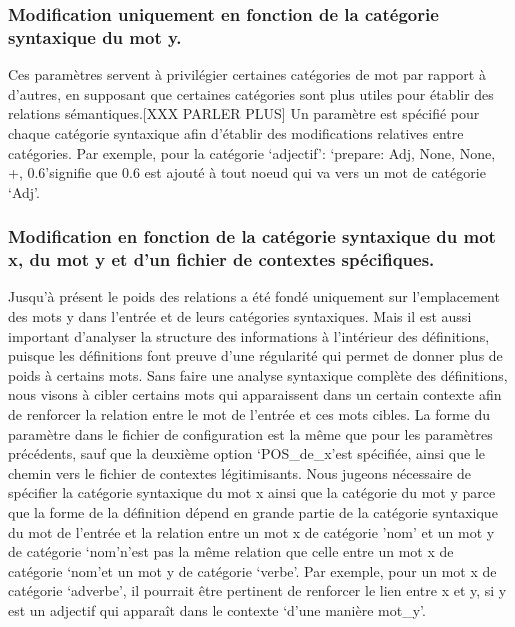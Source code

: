 \documentclass[a4paper, 12pt]{article}
\begin{document}
\subsubsection{Modification uniquement en fonction de la catégorie syntaxique du mot y.}
Ces paramètres servent à privilégier certaines catégories de mot par rapport à d'autres, en supposant que certaines catégories sont plus utiles pour établir des relations sémantiques.[XXX PARLER PLUS] Un paramètre est spécifié pour chaque catégorie syntaxique afin d'établir des modifications relatives entre catégories. Par exemple, pour la catégorie \lq{adjectif}\rq: \lq{prepare: Adj, None, None, +, 0.6}\rq signifie que 0.6 est ajouté à tout noeud qui va vers un mot de catégorie \lq{Adj}\rq.

\subsubsection{Modification en fonction de la catégorie syntaxique du mot x, du mot y et d'un fichier de contextes spécifiques.} 
Jusqu'à présent le poids des relations a été fondé uniquement sur l'emplacement des mots y dans l'entrée et de leurs catégories syntaxiques. Mais il est aussi important d'analyser la structure des informations à l'intérieur des définitions, puisque les définitions font preuve d'une régularité qui permet de donner plus de poids à certains mots. Sans faire une analyse syntaxique complète des définitions, nous visons à cibler certains mots qui apparaissent dans un certain contexte afin de renforcer la relation entre le mot de l'entrée et ces mots cibles. La forme du paramètre dans le fichier de configuration est la même que pour les paramètres précédents, sauf que la deuxième option \lq{POS\_de\_x}\rq est spécifiée, ainsi que le chemin vers le fichier de contextes légitimisants.
\newline\newline
Nous jugeons nécessaire de spécifier la catégorie syntaxique du mot x ainsi que la catégorie du mot y parce que la forme de la définition dépend en grande partie de la catégorie syntaxique du mot de l'entrée et la relation entre un mot x de catégorie 'nom' et un mot y de catégorie \lq{nom}\rq n'est pas la même relation que celle entre un mot x de catégorie \lq{nom}\rq et un mot y de catégorie \lq{verbe}\rq.
\newline\newline
Par exemple, pour un mot x de catégorie \lq{adverbe}\rq, il pourrait être pertinent de renforcer le lien entre x et y, si y est un adjectif qui apparaît dans le contexte \lq{d'une manière mot\_y}\rq.
\end{document}
